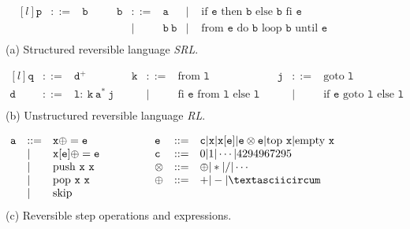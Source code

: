 \begin{figure}[h]

  \begin{minipage}{\textwidth}
    \center
    $$\begin{matrix*}[l]
      \mathtt{p} & ::= & \mathtt{b} & \quad & \mathtt{b} & ::= & \mathtt{a}             & | & \text{ if }\mathtt{e}\text{ then }\mathtt{b}\text{ else }\mathtt{b}\text{ fi }\mathtt{e}\\
                 &     &           &        &            &  |  & \mathtt{b}\ \mathtt{b} & | & \text{ from }\mathtt{e}\text{ do }\mathtt{b}\text{ loop }\mathtt{b}\text{ until }\mathtt{e}\\
    \end{matrix*}$$
    (a) Structured reversible language \textit{SRL}.
  \end{minipage}

  \begin{minipage}{\textwidth}
    \center
    $$\begin{matrix*}[l]
      \mathtt{q} & ::= & \mathtt{d}^+                                      & & \mathtt{k} & ::= & \text{from }\mathtt{l} & & \mathtt{j} & ::= & \text{goto }\mathtt{l}\\
      \mathtt{d} & ::= & \mathtt{l}:\ \mathtt{k}\ \mathtt{a}^*\ \mathtt{j} &       &            &  |  & \text{fi }\mathtt{e}\text{ from }\mathtt{l}\text{ else }\mathtt{l} &   
        & & | & \text{if }\mathtt{e}\text{ goto }\mathtt{l}\text{ else }\mathtt{l}\\
    \end{matrix*}$$
    (b) Unstructured reversible language \textit{RL}.
  \end{minipage}

  \begin{minipage}{\textwidth}
    \center
    $$\begin{matrix*}[l]
      \mathtt{a} & ::= & \mathtt{x}\oplus=\mathtt{e} & \quad\quad\quad & \mathtt{e} & ::= & \mathtt{c}|\mathtt{x}|\mathtt{x}[\mathtt{e}]|\mathtt{e}\otimes\mathtt{e}|\text{top }\mathtt{x}|\text{empty }\mathtt{x}\\
                 &  |  & \mathtt{x}[\mathtt{e}]\oplus=\mathtt{e} &     & \mathtt{c} & ::= & 0|1|\cdots|4294967295\\
                 &  |  & \text{push }\mathtt{x}\ \mathtt{x}      &     & \otimes    & ::= & \oplus|*|/|\cdots\\
                 &  |  & \text{pop  }\mathtt{x}\ \mathtt{x}      &     & \oplus     & ::= & + | - | \textasciicircum\\
                 &  |  & \text{skip}\\
    \end{matrix*}$$
    (c) Reversible step operations and expressions.
  \end{minipage}


\end{figure}
